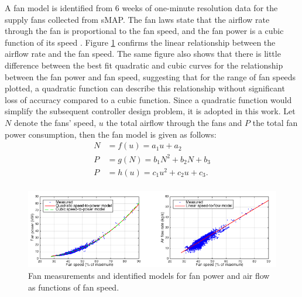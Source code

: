 A fan model is identified from 6 weeks of one-minute resolution data for the supply fans collected from sMAP.
The fan laws state that the airflow rate through the fan is proportional to the fan speed, and the fan power is a cubic function of its speed \cite{Hvac_book}. 
Figure \ref{fig:fan_model} confirms the linear relationship between the airflow rate and the fan speed. 
The same figure also shows that there is little difference between the best fit quadratic and cubic curves for the relationship between the fan power and fan speed, suggesting that for the range of fan speeds plotted, a quadratic function can describe this relationship without significant loss of accuracy compared to a cubic function. %
Since a quadratic function would simplify the subsequent controller design problem, it is adopted in this work. 
Let $N$ denote the fans' speed, $u$ the total airflow through the fans and $P$ the total fan power consumption, then the fan model is given as follows:
\begin{equation}\label{eq:fan_model}
\begin{aligned}
N & = f(u) = a_1 u + a_2\\
P & = g(N) = b_1 N^2 + b_2 N + b_3\\
P & = h(u) = c_1 u^2 + c_2 u + c_3.\\
\end{aligned}
\end{equation} 

\begin{figure}[h]
\centering
\vspace*{1cm}
\includegraphics[width=\textwidth]{chapters/building_exp/figures/fan_model.png}
\caption{Fan measurements and identified models for fan power and air flow as functions of fan speed.}
\label{fig:fan_model}
\vspace*{-0.15cm}
\end{figure}








